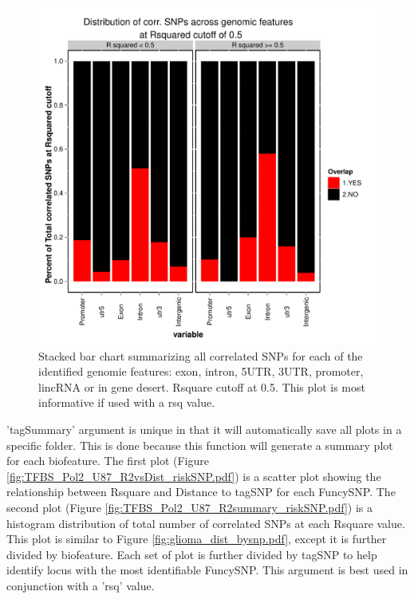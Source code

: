 \documentclass[a4paper]{article}
\begin{document}
\begin{figure}[ht!]
\begin{center}
\includegraphics{glioma_genomic_sum_rcut.pdf}
\caption{\label{fig:glioma_genomic_sum_rcut.pdf} Stacked bar chart summarizing 
all correlated SNPs for each of the identified genomie features: exon, intron, 
5UTR, 3UTR, promoter, lincRNA or in gene desert. Rsquare cutoff
 at 0.5. This plot is most informative if used with a rsq value.}
{\footnotesize{}}
\end{center}
\end{figure}
'tagSummary' argument is unique in that it will automatically save all plots in a
specific folder. This is done because this function will generate a summary 
plot for each biofeature.  The first plot (Figure 
        \ref{fig:TFBS_Pol2_U87_R2vsDist_riskSNP.pdf}) is a scatter plot showing 
the relationship between Rsquare and Distance to tagSNP for each FuncySNP. The
 second plot (Figure \ref{fig:TFBS_Pol2_U87_R2summary_riskSNP.pdf}) is a 
 histogram distribution of total number of correlated SNPs at each 
 Rsquare value. This plot is similar to Figure \ref{fig:glioma_dist_bysnp.pdf}, 
 except it is further divided by biofeature. Each set of plot is further divided 
 by tagSNP to help identify locus with the most identifiable FuncySNP. This argument
 is best used in conjunction with a 'rsq' value.
\end{document}
